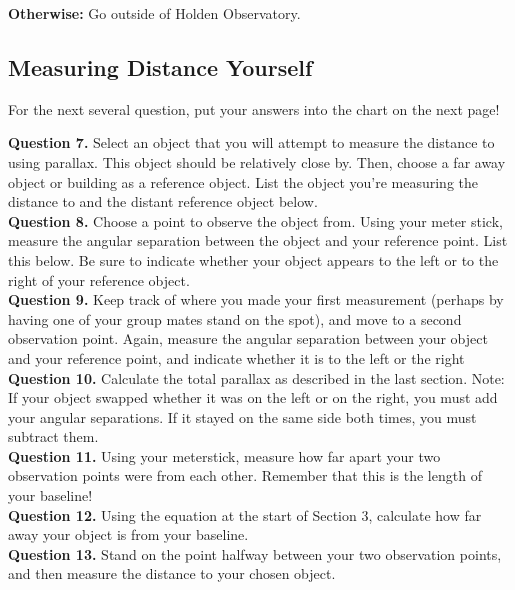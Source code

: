 \documentclass[11pt]{article}
\begin{document}
\textbf{Otherwise:} Go outside of Holden Observatory.

\newpage

\subsection{Measuring Distance Yourself}
For the next several question, put your answers into the chart on the next page!

\textbf{Question 7.} Select an object that you will attempt to measure the distance to using parallax. This object should be relatively close by. Then, choose a far away object or building as a reference object. List the object you're measuring the distance to and the distant reference object below.\\

\textbf{Question 8.} Choose a point to observe the object from. Using your meter stick, measure the angular separation between the object and your reference point. List this below. Be sure to indicate whether your object appears to the left or to the right of your reference object.\\

\textbf{Question 9.} Keep track of where you made your first measurement (perhaps by having one of your group mates stand on the spot), and move to a second observation point. Again, measure the angular separation between your object and your reference point, and indicate whether it is to the left or the right\\

\textbf{Question 10.} Calculate the total parallax as described in the last section. Note: If your object swapped whether it was on the left or on the right, you must add your angular separations. If it stayed on the same side both times, you must subtract them.\\

\textbf{Question 11.} Using your meterstick, measure how far apart your two observation points were from each other. Remember that this is the length of your baseline!\\

\textbf{Question 12.} Using the equation at the start of Section 3, calculate how far away your object is from your baseline.\\

\textbf{Question 13.} Stand on the point halfway between your two observation points, and then measure the distance to your chosen object.\\
\end{document}
